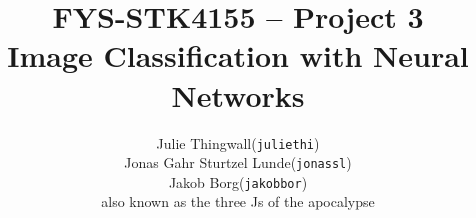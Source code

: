 \documentclass[10pt, twocolumn]{article}
\begin{document}
\title{FYS-STK4155 -- Project 3\\ Image Classification with Neural Networks}
\author{
	\begin{tabular}{rl}
        Julie Thingwall & (\texttt{juliethi})\\
        Jonas Gahr Sturtzel Lunde & (\texttt{jonassl})\\
        Jakob Borg & (\texttt{jakobbor}) \\
        \tiny{also known as the three Js of the apocalypse}
	\end{tabular}
    }
\date{}

\setlength{\epigraphwidth}{0.75\textwidth}
\renewcommand{\epigraphflush}{center}
\renewcommand{\beforeepigraphskip}{30pt}
\renewcommand{\afterepigraphskip}{50pt}
\renewcommand{\epigraphsize}{\normalsize}
\end{document}
